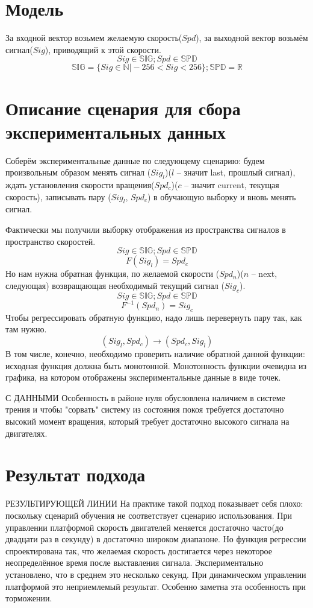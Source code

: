 \documentclass[14pt]{extreport}
\begin{document}
            \section{Модель}
                За входной вектор возьмем желаемую скорость($Spd$), за выходной вектор возьмём сигнал($Sig$), приводящий к этой скорости.
                \[Sig \in \mathbb{SIG}; Spd \in \mathbb{SPD}\]
                \[\mathbb{SIG} = \{Sig \in \mathbb{N}\vert -256 < Sig < 256\}; \mathbb{SPD} = \mathbb{R}\]
            \section{Описание сценария для сбора экспериментальных данных}
                Соберём экспериментальные данные по следующему сценарию: будем произвольным образом менять сигнал ($Sig_l$)($l$ -- значит last, прошлый сигнал), ждать установления скорости вращения($Spd_c$)($c$ -- значит current, текущая скорость), записывать пару ($Sig_l$, $Spd_c$) в обучающую выборку и вновь менять сигнал.

                Фактически мы получили выборку отображения из пространства сигналов в пространство скоростей.
                \[Sig \in \mathbb{SIG}; Spd \in \mathbb{SPD}\]
                \[F(Sig_l) = Spd_c\]
                Но нам нужна обратная функция, по желаемой скорости ($Spd_n$)($n$ -- next, следующая) возвращающая необходимый текущий сигнал ($Sig_c$).
                \[Sig \in \mathbb{SIG}; Spd \in \mathbb{SPD}\]
                \[F^{-1}(Spd_n) = Sig_c\]
                Чтобы регрессировать обратную функцию, надо лишь перевернуть пару так, как там нужно.
                \[(Sig_l, Spd_c) \rightarrow (Spd_c, Sig_l)\]
                В том числе, конечно, необходимо проверить наличие обратной данной функции: исходная функция должна быть монотонной. Монотонность функции очевидна из графика, на котором отображены экспериментальные данные в виде точек.

                { С ДАННЫМИ}
                Особенность в районе нуля обусловлена наличием в системе трения и чтобы "сорвать" систему из состояния покоя требуется достаточно высокий момент вращения, который требует достаточно высокого сигнала на двигателях.
            \section{Результат подхода}

                { РЕЗУЛЬТИРУЮЩЕЙ ЛИНИИ}
                На практике такой подход показывает себя плохо: поскольку сценарий обучения не соответствует сценарию использования. При управлении платформой скорость двигателей меняется достаточно часто(до двадцати раз в секунду) в достаточно широком диапазоне. Но функция регрессии спроектирована так, что желаемая скорость достигается через некоторое неопределённое время после выставления сигнала. Экспериментально установлено, что в среднем это несколько секунд. При динамическом управлении платформой это неприемлемый результат. Особенно заметна эта особенность при торможении.
\end{document}
